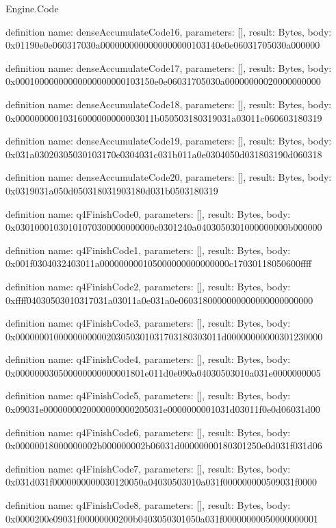 \begin{lexlean}{Engine.Code}
\begin{semanticmodule}
definition{
  name: denseAccumulateCode16,
  parameters: [],
  result: Bytes,
  body: 0x01190e0e060317030a0000000000000000000103140e0e06031705030a000000
}

definition{
  name: denseAccumulateCode17,
  parameters: [],
  result: Bytes,
  body: 0x00010000000000000000000103150e0e06031705030a00000000020000000000
}

definition{
  name: denseAccumulateCode18,
  parameters: [],
  result: Bytes,
  body: 0x00000000010316000000000003011b050503180319031a03011c060603180319
}

definition{
  name: denseAccumulateCode19,
  parameters: [],
  result: Bytes,
  body: 0x031a03020305030103170e0304031c031b011a0e0304050d031803190d060318
}

definition{
  name: denseAccumulateCode20,
  parameters: [],
  result: Bytes,
  body: 0x0319031a050d050318031903180d031b0503180319
}

definition{
  name: q4FinishCode0,
  parameters: [],
  result: Bytes,
  body: 0x03010001030101070300000000000c0301240a0403050301000000000b000000
}

definition{
  name: q4FinishCode1,
  parameters: [],
  result: Bytes,
  body: 0x001f0304032403011a000000000105000000000000000c17030118050600ffff
}

definition{
  name: q4FinishCode2,
  parameters: [],
  result: Bytes,
  body: 0xffff04030503010317031a03011a0e031a0e0603180000000000000000000000
}

definition{
  name: q4FinishCode3,
  parameters: [],
  result: Bytes,
  body: 0x0000000100000000000203050301031703180303011d00000000000301230000
}

definition{
  name: q4FinishCode4,
  parameters: [],
  result: Bytes,
  body: 0x000000030500000000000001801e011d0e090a04030503010a031e0000000005
}

definition{
  name: q4FinishCode5,
  parameters: [],
  result: Bytes,
  body: 0x09031e0000000020000000000205031e0000000001031d03011f0e0d06031d00
}

definition{
  name: q4FinishCode6,
  parameters: [],
  result: Bytes,
  body: 0x00000018000000002b000000002b06031d00000000180301250e0d031f031d06
}

definition{
  name: q4FinishCode7,
  parameters: [],
  result: Bytes,
  body: 0x031d031f0000000000030120050a04030503010a031f000000000509031f0000
}

definition{
  name: q4FinishCode8,
  parameters: [],
  result: Bytes,
  body: 0x0000200e09031f00000000200b0403050301050a031f00000000050000000001
}


\end{semanticmodule}
\end{lexlean}
